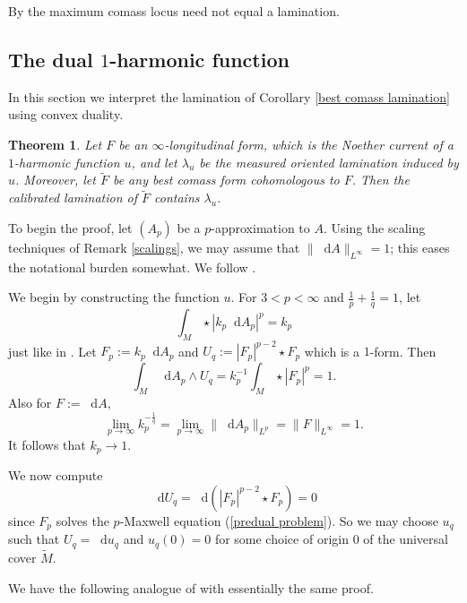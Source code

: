 \documentclass[reqno,11pt]{amsart}
\newcommand*\dif{\mathop{}\!\mathrm{d}}
\newtheorem{theorem}{Theorem}[section]
\theoremstyle{definition}
\numberwithin{equation}{section}
\begin{document}
By \cite[Example 5.4]{bangert_cui_2017} the maximum comass locus need not equal a lamination.

\subsection{The dual \texorpdfstring{$1$-harmonic}{1-harmonic} function}
In this section we interpret the lamination of Corollary \ref{best comass lamination} using convex duality.

\begin{theorem}
Let $F$ be an $\infty$-longitudinal form, which is the Noether current of a $1$-harmonic function $u$, and let $\lambda_u$ be the measured oriented lamination induced by $u$.
Moreover, let $\tilde F$ be any best comass form cohomologous to $F$.
Then the calibrated lamination of $\tilde F$ contains $\lambda_u$.
\end{theorem}


To begin the proof, let $(A_p)$ be a $p$-approximation to $A$.
Using the scaling techniques of Remark \ref{scalings}, we may assume that $\|\dif A\|_{L^\infty} = 1$; this eases the notational burden somewhat.
We follow \cite[\S6.1]{daskalopoulos2020transverse}.

We begin by constructing the function $u$.
For $3 < p < \infty$ and $\frac{1}{p} + \frac{1}{q} = 1$, let
$$\int_M \star |k_p \dif A_p|^p = k_p$$
just like in \cite[\S3.2]{daskalopoulos2020transverse}.
Let $F_p := k_p \dif A_p$ and $U_q := |F_p|^{p - 2} \star F_p$ which is a $1$-form.
Then 
\begin{equation}\label{dAp wedge Uq}
\int_M \dif A_p \wedge U_q = k_p^{-1} \int_M \star |F_p|^p = 1.
\end{equation}
Also for $F := \dif A$,
$$\lim_{p \to \infty} k_p^{-\frac{1}{q}} = \lim_{p \to \infty} \|\dif A_p\|_{L^p} = \|F\|_{L^\infty} = 1.$$
It follows that $k_p \to 1$.

We now compute
\begin{equation}\label{Uq is closed}
	\dif U_q = \dif(|F_p|^{p - 2} \star F_p) = 0
\end{equation}
since $F_p$ solves the $p$-Maxwell equation (\ref{predual problem}).
So we may choose $u_q$ such that $U_q = \dif u_q$ and $u_q(0) = 0$ for some choice of origin $0$ of the universal cover $\tilde M$.

We have the following analogue of \cite[Theorem 4.3]{daskalopoulos2020transverse} with essentially the same proof.
\end{document}
